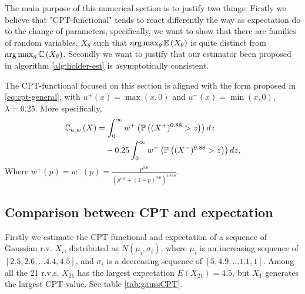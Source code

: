 The main purpose of this numerical section is to justify two things: Firstly we believe that "CPT-functional" tends to react differently the way as expectation do to the change of parameters, specifically, we want to show that there are families of random variables, $X_\theta$ such that $\mathop{\rm arg\,max}_{\theta} \mathbb{E}\left( X_\theta \right)$ is quite distinct from 
$\mathop{\rm arg\,max}_{\theta} \mathbb{C} \left( X_\theta \right)$. Secondly we want to justify that our estimator been proposed in algorithm 
\ref{alg:holder-est} is asymptotically consistent.

The CPT-functional focused on this section is aligned with the form proposed in \eqref{eq:cpt-general}, with $u^+(x) = \max(x,0)$ and 
$u^-(x) = \min(x,0)$, $\lambda = 0.25$. 
More specifically,
\begin{align}
\mathbb{C}_{u,w}\left(X\right) &= \int_0^{\infty} w^+\left(\mathbb{P}\left( (X^+)^{0.88}>z \right)\right) dz\nonumber \\
&\quad - 0.25 \int_0^{\infty} w^-\left(\mathbb{P}\left( (X^-)^{0.88}>z \right)\right) dz \label{eq:CPT-numerical-section} , 
\end{align}
Where $w^+(p) = w^-(p) = \frac{p^{0.6}}{(p^{0.6} + (1-p)^{0.6})^{1/0.6}}.$ 

\subsection{Comparison between CPT and expectation}
Firstly we estimate the CPT-functional and expectation of a sequence of Gaussian r.v. $X_i$, distributed as $N(\mu_i, \sigma_i)$, where
$\mu_i$ is an increasing sequence of $[2.5, 2.6, \ldots 4.4, 4.5]$, and $\sigma_i$ is a decreasing sequence of $[5, 4.9, \ldots 1.1, 1]$.
Among all the 21 r.v.s, $X_{21}$ has the largest expectation $E(X_{21}) = 4.5$, but $X_1$ generates the largest CPT-value. See table
\ref{tab:gaussCPT}.


